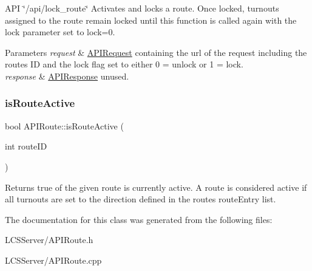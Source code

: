 A\+PI \char`\"{}/api/lock\+\_\+route\char`\"{} Activates and locks a route. Once locked, turnouts assigned to the route remain locked until this function is called again with the lock parameter set to lock=0. 
\begin{DoxyParams}{Parameters}
{\em request} & \hyperlink{class_a_p_i_request}{A\+P\+I\+Request} containing the url of the request including the route\textquotesingle{}s ID and the lock flag set to either 0 = unlock or 1 = lock. \\
\hline
{\em response} & \hyperlink{class_a_p_i_response}{A\+P\+I\+Response} unused. \\
\hline
\end{DoxyParams}
\mbox{\label{class_a_p_i_route_afbd5b3b86ddacee31d16330de4d069df}} 
\subsubsection{\texorpdfstring{is\+Route\+Active}{isRouteActive}}
{\footnotesize\ttfamily bool A\+P\+I\+Route\+::is\+Route\+Active (\begin{DoxyParamCaption}\item[{int}]{route\+ID }\end{DoxyParamCaption})\hspace{0.3cm}{\ttfamily [slot]}}

Returns true of the given route is currently active. A route is considered active if all turnouts are set to the direction defined in the route\textquotesingle{}s route\+Entry list. 

The documentation for this class was generated from the following files\+:\begin{DoxyCompactItemize}
\item 
L\+C\+S\+Server/A\+P\+I\+Route.\+h\item 
L\+C\+S\+Server/A\+P\+I\+Route.\+cpp\end{DoxyCompactItemize}
